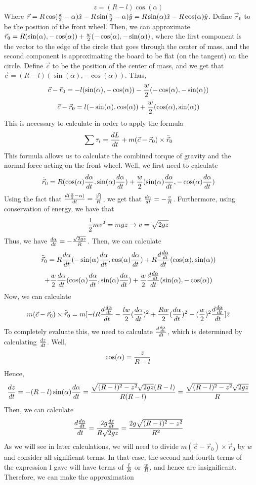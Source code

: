 $$z=(R-l)\cos(\alpha)$$
Where $\vec r=R\cos(\frac \pi 2-\alpha)\hat x-R\sin(\frac \pi 2-\alpha)\hat y=R\sin(\alpha)\hat x-R\cos(\alpha)\hat y$.  Define $\vec r_0$ to be the position of the front wheel.  Then, we can approximate $\vec r_0=R(\sin(\alpha), -\cos(\alpha))+\frac{w}{2}(-\cos(\alpha), -\sin(\alpha))$, where the first component is the vector to the edge of the circle that goes through the center of mass, and the second component is approximating the board to be flat (on the tangent) on the circle.  Define $\vec c$ to be the position of the center of mass, and we get that $\vec c=(R-l)(\sin(\alpha), -\cos(\alpha))$.  Thus,
$$\vec c-\vec r_0=-l(\sin(\alpha), -\cos(\alpha))-\frac{w}{2}(-\cos(\alpha), -\sin(\alpha))$$
$$\vec c-\vec r_0=l(-\sin(\alpha), \cos(\alpha))+\frac w 2(\cos(\alpha), \sin(\alpha))$$
This is necessary to calculate in order to apply the formula
$$\sum \tau_i=\frac{dL}{dt}+m(\vec c-\vec r_0)\times \ddot {\vec r}_0$$
This formula allows us to calculate the combined torque of gravity and the normal force acting on the front wheel.  Well, we first need to calculate
$$\dot{\vec r}_0=R(\cos(\alpha)\frac{d\alpha}{dt}, \sin(\alpha)\frac{d\alpha}{dt})+\frac w 2(\sin(\alpha)\frac{d\alpha}{dt}, -\cos(\alpha)\frac{d\alpha}{dt})$$
Using the fact that $\frac{d(\frac \pi 2-\alpha)}{dt}=\frac{|\vec {\dot r}|}{R}$, we get that $\frac{d\alpha}{dt}=-\frac {v} R$.  Furthermore, using conservation of energy, we have that
$$\frac 1 2 m v^2=mgz\rightarrow v=\sqrt {2gz}$$
Thus, we have $\frac{d\alpha}{dt}=-\frac{\sqrt {2gz}}R$.  Then, we can calculate
$$\ddot{\vec r}_0=R\frac{d\alpha}{dt}(-\sin(\alpha)\frac{d\alpha}{dt}, \cos(\alpha) \frac{d\alpha}{dt})+R \frac{d\frac{d\alpha}{dt}}{dt}(\cos(\alpha), \sin(\alpha))$$
$$+\frac w 2 \frac{d\alpha}{dt} (\cos(\alpha) \frac{d\alpha}{dt}, \sin(\alpha) \frac{d\alpha}{dt})+\frac w 2 \frac{d\frac{d\alpha}{dt}}{dt}(\sin(\alpha), -\cos(\alpha))$$
Now, we can calculate
$$m(\vec c-\vec r_0)\times \ddot {\vec r}_0=m[-l R \frac{d\frac{d\alpha}{dt}}{dt}-\frac{lw}{2}(\frac{d\alpha}{dt})^2+\frac {Rw}{2}(\frac{d\alpha}{dt})^2-(\frac w 2)^2 \frac{d\frac{d\alpha}{dt}}{dt}]\hat z$$
To completely evaluate this, we need to calculate $\frac{d\frac{d\alpha}{dt}}{dt}$, which is determined by calculating $\frac{dz}{dt}$.  Well, 
$$\cos(\alpha)=\frac{z}{R-l}$$
Hence, $$\frac{dz}{dt}=-(R-l)\sin(\alpha) \frac{d\alpha}{dt}=\frac{\sqrt{(R-l)^2-z^2}\sqrt{2gz}(R-l)}{R(R-l)}=\frac{\sqrt{(R-l)^2-z^2}\sqrt{2gz}}{R}$$
Then, we can calculate
$$\frac{d\frac{d\alpha}{dt}}{dt}=\frac {2g \frac{dz}{dt}}{R\sqrt{2gz}}=\frac {2g \sqrt{(R-l)^2-z^2}}{R^2}$$
As we will see in later calculations, we will need to divide $m(\vec c-\vec r_0)\times \ddot {\vec r}_0$ by $w$ and consider all significant terms.  In that case, the second and fourth terms of the expression I gave will have terms of $\frac{l}{R}$ or $\frac{w}{R}$, and hence are insignificant.  Therefore, we can make the approximation
